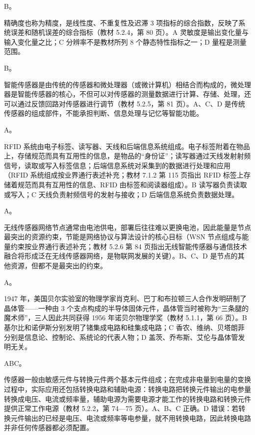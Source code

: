 \documentclass[a4paper,11pt]{article}
\begin{document}
\q B。\begin{analysis}精确度也称为精度，是线性度、不重复性及迟滞 3 项指标的综合指数，反映了系统误差和随机误差的综合指标（教材 5.2.4，第 80 页）。A 灵敏度是输出变化量与输入变化量之比；C 分辨率不是教材所列 8 个静态特性指标之一；D 量程是测量范围。\end{analysis}

\q B。\begin{analysis}智能传感器是由传统的传感器和微处理器（或微计算机）相结合而构成的，微处理器是智能传感器的核心，不但可以对传感器的测量数据进行计算、存储、处理，还可以通过反馈回路对传感器进行调节（教材 5.2.5，第 81 页）。A、C、D 是传统传感器的组成部件，不能承担判断、信息处理与记忆等智能功能。\end{analysis}

\q A。\begin{analysis}RFID 系统由电子标签、读写器、天线和后端信息系统组成。电子标签附着在物品上，存储规范而具有互用性的信息，是物品的“身份证”；读写器通过天线发射射频信号，读取或写入标签信息；后端信息系统对采集到的数据进行处理和应用（RFID 系统组成按业界通行表述补充；教材 7.1.2 第 115 页指出 RFID 标签上存储着规范而具有互用性的信息、RFID 由标签和阅读器组成）。B 读写器负责读取或写入；C 天线负责射频信号的发射与接收；D 后端信息系统负责数据处理。\end{analysis}

\q A。\begin{analysis}无线传感器网络节点通常由电池供电，部署后往往难以更换电池，因此能量是节点最突出的资源约束，节能是网络协议与算法设计的核心目标（WSN 节点组成与能量约束按业界通行表述补充；教材 5.2.6 第 84 页指出无线智能传感器与通信技术融合将形成泛在无线传感器网络，是物联网发展的关键）。B、C、D 是节点的其他资源，但都不是最突出的约束。\end{analysis}

\q A。\begin{analysis}1947 年，美国贝尔实验室的物理学家肖克利、巴丁和布拉顿三人合作发明研制了晶体管——一种由 3 个支点构成的半导体固体元件，晶体管当时被称为“三条腿的魔术师”，三人因此共同获得 1956 年诺贝尔物理学奖（教材 5.1.1，第 66 页）。B 基尔比和诺伊斯分别发明了锗集成电路和硅集成电路；C 香农、维纳、贝塔朗菲分别是信息论、控制论、系统论的代表人物；D 盖茨、乔布斯、艾伦与晶体管发明无关。\end{analysis}


\q ABC。\begin{analysis}传感器一般由敏感元件与转换元件两个基本元件组成；在完成非电量到电量的变换过程中，实际应用还包括转换电路和辅助电源：转换电路把转换元件输出的电参量转换成电压、电流或频率量，辅助电源为需要电源才能工作的转换电路和转换元件提供正常工作电源（教材 5.2.2，第 74—75 页）。A、B、C 正确。D 错误：若转换元件输出的已经是电压、电流或频率等电参量，就不用转换电路，因此转换电路并非任何传感器都必须配置。\end{analysis}
\end{document}
